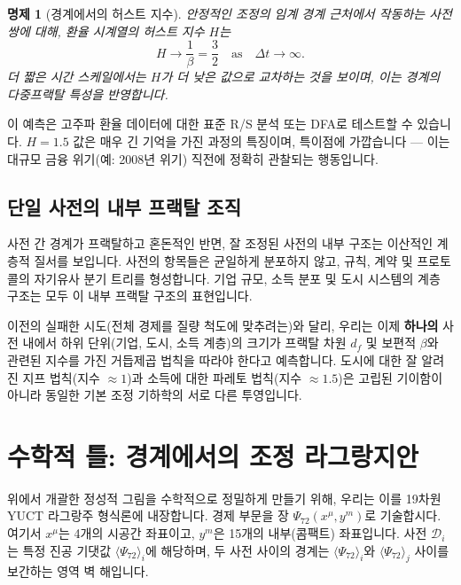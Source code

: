 \documentclass[12pt,a4paper]{article}
\newtheorem{proposition}[theorem]{명제}
\theoremstyle{remark}
\begin{document}
	\begin{proposition}[경계에서의 허스트 지수]
		안정적인 조정의 임계 경계 근처에서 작동하는 사전 쌍에 대해, 환율 시계열의 허스트 지수 \(H\)는
		\begin{equation}
			H \to \frac{1}{\beta} = \frac{3}{2} \quad \text{as} \quad \Delta t \to \infty.
			\label{eq:hurst}
		\end{equation}
		더 짧은 시간 스케일에서는 \(H\)가 더 낮은 값으로 교차하는 것을 보이며, 이는 경계의 다중프랙탈 특성을 반영합니다.
	\end{proposition}
	
	이 예측은 고주파 환율 데이터에 대한 표준 R/S 분석 또는 DFA로 테스트할 수 있습니다. \(H = 1.5\) 값은 매우 긴 기억을 가진 과정의 특징이며, 특이점에 가깝습니다 — 이는 대규모 금융 위기(예: 2008년 위기) 직전에 정확히 관찰되는 행동입니다.
	
	\subsection{단일 사전의 내부 프랙탈 조직}
	
	사전 간 경계가 프랙탈하고 혼돈적인 반면, 잘 조정된 사전의 내부 구조는 이산적인 계층적 질서를 보입니다. 사전의 항목들은 균일하게 분포하지 않고, 규칙, 계약 및 프로토콜의 자기유사 분기 트리를 형성합니다. 기업 규모, 소득 분포 및 도시 시스템의 계층 구조는 모두 이 내부 프랙탈 구조의 표현입니다.
	
	이전의 실패한 시도(전체 경제를 질량 척도에 맞추려는)와 달리, 우리는 이제 \textbf{하나의} 사전 내에서 하위 단위(기업, 도시, 소득 계층)의 크기가 프랙탈 차원 \(d_f\) 및 보편적 \(\beta\)와 관련된 지수를 가진 거듭제곱 법칙을 따라야 한다고 예측합니다. 도시에 대한 잘 알려진 지프 법칙(지수 \(\approx 1\))과 소득에 대한 파레토 법칙(지수 \(\approx 1.5\))은 고립된 기이함이 아니라 동일한 기본 조정 기하학의 서로 다른 투영입니다.
	
	\section{수학적 틀: 경계에서의 조정 라그랑지안}
	
	위에서 개괄한 정성적 그림을 수학적으로 정밀하게 만들기 위해, 우리는 이를 19차원 YUCT 라그랑주 형식론에 내장합니다. 경제 부문을 장 \(\Psi_{72}(x^\mu, y^m)\)로 기술합시다. 여기서 \(x^\mu\)는 4개의 시공간 좌표이고, \(y^m\)은 15개의 내부(콤팩트) 좌표입니다. 사전 \(\mathcal{D}_i\)는 특정 진공 기댓값 \(\langle \Psi_{72} \rangle_i\)에 해당하며, 두 사전 사이의 경계는 \(\langle \Psi_{72} \rangle_i\)와 \(\langle \Psi_{72} \rangle_j\) 사이를 보간하는 영역 벽 해입니다.
	
\end{document}
